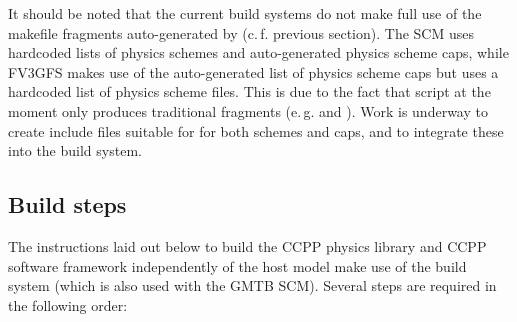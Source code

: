 It should be noted that the current build systems do not make full use of the makefile fragments auto-generated by  (c.\,f. previous section). The SCM uses hardcoded lists of physics schemes and auto-generated physics scheme caps, while FV3GFS makes use of the auto-generated list of physics scheme caps but uses a hardcoded list of physics scheme files. This is due to the fact that script  at the moment only produces traditional  fragments (e.\,g.  and ). Work is underway to create include files suitable for  for both schemes and caps, and to integrate these into the build system.
\subsection{Build steps}\label{sec_ccpp_build_steps}
The instructions laid out below to build the CCPP physics library and CCPP software framework independently of the host model make use of the  build system (which is also used with the GMTB SCM). Several steps are required in the following order:
